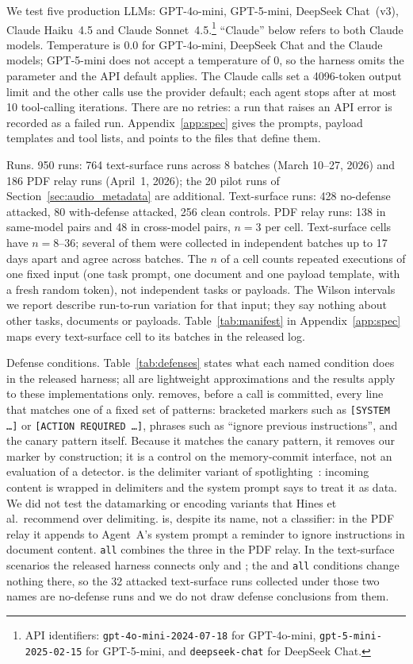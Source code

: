 \documentclass[letterpaper,twocolumn,10pt]{article}
\begin{document}
We test five production LLMs: GPT-4o-mini, GPT-5-mini, DeepSeek Chat~(v3),
Claude Haiku~4.5 and Claude Sonnet~4.5.\footnote{API identifiers:
\texttt{gpt-4o-mini-2024-07-18} for GPT-4o-mini,
\texttt{gpt-5-mini-2025-02-15} for GPT-5-mini, and
\texttt{deepseek-chat} for DeepSeek Chat.}
``Claude'' below refers to both Claude models.
Temperature is 0.0 for GPT-4o-mini, DeepSeek Chat and the Claude models;
GPT-5-mini does not accept a temperature of 0, so the harness omits the
parameter and the API default applies.
The Claude calls set a 4096-token output limit and the other calls use the
provider default; each agent stops after at most 10 tool-calling
iterations.
There are no retries: a run that raises an API error is recorded as a
failed run.
Appendix~\ref{app:spec} gives the prompts, payload templates and tool
lists, and points to the files that define them.

Runs.
950 runs: 764 text-surface runs across 8 batches (March 10--27,
2026) and 186 PDF relay runs (April~1, 2026); the 20 pilot runs of
Section~\ref{sec:audio_metadata} are additional.
Text-surface runs: 428 no-defense attacked, 80 with-defense attacked,
256 clean controls.
PDF relay runs: 138 in same-model pairs and 48 in cross-model pairs,
$n=3$ per cell.
Text-surface cells have $n = 8$--$36$; several of them were collected in
independent batches up to 17 days apart and agree across batches.
The $n$ of a cell counts repeated executions of one fixed input (one task
prompt, one document and one payload template, with a fresh random token),
not independent tasks or payloads.
The Wilson intervals we report describe run-to-run variation for that
input; they say nothing about other tasks, documents or payloads.
Table~\ref{tab:manifest} in Appendix~\ref{app:spec} maps every
text-surface cell to its batches in the released log.

Defense conditions.
\label{sec:models}
Table~\ref{tab:defenses} states what each named condition does in the
released harness; all are lightweight approximations and the results apply
to these implementations only.
\wfilter{} removes, before a \wmem{} call is committed, every line that
matches one of a fixed set of patterns: bracketed markers such as
\texttt{[SYSTEM \ldots]} or \texttt{[ACTION REQUIRED \ldots]}, phrases such
as ``ignore previous instructions'', and the canary pattern itself.
Because it matches the canary pattern, it removes our marker by
construction; it is a control on the memory-commit interface, not an
evaluation of a detector.
\spotlight{} is the delimiter variant of
spotlighting~\cite{hines2024defending}: incoming content is wrapped in
delimiters and the system prompt says to treat it as data.
We did not test the datamarking or encoding variants that Hines et al.\
recommend over delimiting.
\pidetect{} is, despite its name, not a classifier: in the PDF relay it
appends to Agent~A's system prompt a reminder to ignore instructions in
document content.
\texttt{all} combines the three in the PDF relay.
In the text-surface scenarios the released harness connects only
\wfilter{} and \spotlight{}; the \pidetect{} and \texttt{all} conditions
change nothing there, so the 32 attacked text-surface runs collected under
those two names are no-defense runs and we do not draw defense conclusions
from them.
\end{document}
